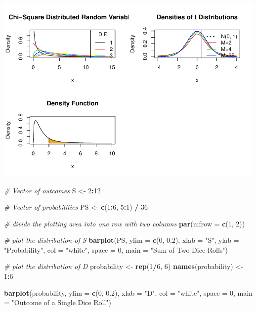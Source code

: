 \documentclass[
]{book}
\newenvironment{Shaded}{\begin{snugshade}}{\end{snugshade}}
\newcommand{\CommentTok}[1]{\textcolor[rgb]{0.56,0.35,0.01}{\textit{#1}}}
\newcommand{\DataTypeTok}[1]{\textcolor[rgb]{0.13,0.29,0.53}{#1}}
\newcommand{\DecValTok}[1]{\textcolor[rgb]{0.00,0.00,0.81}{#1}}
\newcommand{\FloatTok}[1]{\textcolor[rgb]{0.00,0.00,0.81}{#1}}
\newcommand{\KeywordTok}[1]{\textcolor[rgb]{0.13,0.29,0.53}{\textbf{#1}}}
\newcommand{\NormalTok}[1]{#1}
\newcommand{\OperatorTok}[1]{\textcolor[rgb]{0.81,0.36,0.00}{\textbf{#1}}}
\newcommand{\StringTok}[1]{\textcolor[rgb]{0.31,0.60,0.02}{#1}}
\begin{document}
\includegraphics{Metrics_files/figure-latex/unnamed-chunk-12-2.pdf}

\begin{Shaded}
\begin{Highlighting}[]
\CommentTok{# Vector of outcomes}
\NormalTok{S <-}\StringTok{ }\DecValTok{2}\OperatorTok{:}\DecValTok{12}

\CommentTok{# Vector of probabilities}
\NormalTok{PS <-}\StringTok{ }\KeywordTok{c}\NormalTok{(}\DecValTok{1}\OperatorTok{:}\DecValTok{6}\NormalTok{, }\DecValTok{5}\OperatorTok{:}\DecValTok{1}\NormalTok{) }\OperatorTok{/}\StringTok{ }\DecValTok{36}

\CommentTok{# divide the plotting area into one row with two columns}
\KeywordTok{par}\NormalTok{(}\DataTypeTok{mfrow =} \KeywordTok{c}\NormalTok{(}\DecValTok{1}\NormalTok{, }\DecValTok{2}\NormalTok{))}

\CommentTok{# plot the distribution of S}
\KeywordTok{barplot}\NormalTok{(PS, }
        \DataTypeTok{ylim =} \KeywordTok{c}\NormalTok{(}\DecValTok{0}\NormalTok{, }\FloatTok{0.2}\NormalTok{), }
        \DataTypeTok{xlab =} \StringTok{"S"}\NormalTok{, }
        \DataTypeTok{ylab =} \StringTok{"Probability"}\NormalTok{, }
        \DataTypeTok{col =} \StringTok{"white"}\NormalTok{, }
        \DataTypeTok{space =} \DecValTok{0}\NormalTok{, }
        \DataTypeTok{main =} \StringTok{"Sum of Two Dice Rolls"}\NormalTok{)}

\CommentTok{# plot the distribution of D }
\NormalTok{probability <-}\StringTok{ }\KeywordTok{rep}\NormalTok{(}\DecValTok{1}\OperatorTok{/}\DecValTok{6}\NormalTok{, }\DecValTok{6}\NormalTok{)}
\KeywordTok{names}\NormalTok{(probability) <-}\StringTok{ }\DecValTok{1}\OperatorTok{:}\DecValTok{6}

\KeywordTok{barplot}\NormalTok{(probability, }
        \DataTypeTok{ylim =} \KeywordTok{c}\NormalTok{(}\DecValTok{0}\NormalTok{, }\FloatTok{0.2}\NormalTok{), }
        \DataTypeTok{xlab =} \StringTok{"D"}\NormalTok{, }
        \DataTypeTok{col =} \StringTok{"white"}\NormalTok{, }
        \DataTypeTok{space =} \DecValTok{0}\NormalTok{, }
        \DataTypeTok{main =} \StringTok{"Outcome of a Single Dice Roll"}\NormalTok{)}
\end{Highlighting}
\end{Shaded}
\end{document}
